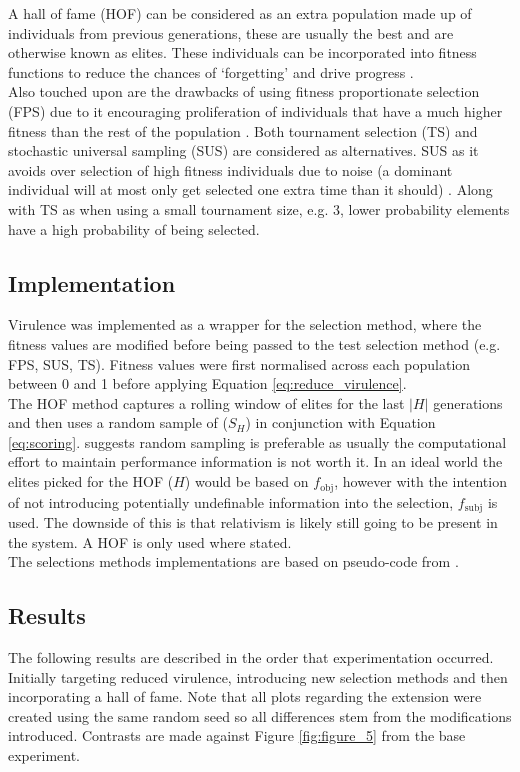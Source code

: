 \documentclass[11pt,a4paper]{article}
\begin{document}
\noindent A hall of fame (HOF) can be considered as an extra population made up of individuals from previous generations, these are usually the best and are otherwise known as elites. These individuals can be incorporated into fitness functions to reduce the chances of `forgetting' and drive progress \parencite{Ranjeet:2011}.\\

\noindent Also touched upon are the drawbacks of using fitness proportionate selection (FPS) due to it encouraging proliferation of individuals that have a much higher fitness than the rest of the population \parencite{Blickle:1996}. Both tournament selection (TS) and stochastic universal sampling (SUS) are considered as alternatives. SUS as it avoids over selection of high fitness individuals due to noise (a dominant individual will at most only get selected one extra time than it should) \parencite{Blickle:1996}. Along with TS as when using a small tournament size, e.g. 3, lower probability elements have a high probability of being selected.


\subsection{Implementation}
\noindent Virulence was implemented as a wrapper for the selection method, where the fitness values are modified before being passed to the test selection method (e.g. FPS, SUS, TS). Fitness values were first normalised across each population between 0 and 1 before applying Equation \ref{eq:reduce_virulence}.\\

\noindent The HOF method captures a rolling window of elites for the last $|H|$ generations and then uses a random sample of ($S_H$) in conjunction with Equation \ref{eq:scoring}. \cite{Rosin:1997} suggests random sampling is preferable as usually the computational effort to maintain performance information is not worth it. In an ideal world the elites picked for the HOF ($H$) would be based on $f_\text{obj}$, however with the intention of not introducing potentially undefinable information into the selection, $f_\text{subj}$ is used. The downside of this is that relativism is likely still going to be present in the system. A HOF is only used where stated.\\

\noindent The selections methods implementations are based on pseudo-code from \cite{Blickle:1996}.

\subsection{Results}
\noindent The following results are described in the order that experimentation occurred. Initially targeting reduced virulence, introducing new selection methods and then incorporating a hall of fame. Note that all plots regarding the extension were created using the same random seed so all differences stem from the modifications introduced. Contrasts are made against Figure \ref{fig:figure_5} from the base experiment.\\
\end{document}
